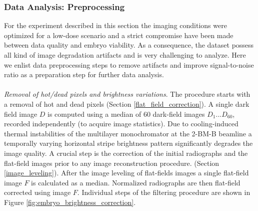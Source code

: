 \subsubsection{Data Analysis: Preprocessing}
For the experiment described in this section the imaging conditions were optimized for a low-dose scenario and a strict compromise have been made between data quality and embryo viability. As a consequence, the dataset possess all kind of image degradation artifacts and is very challenging to analyze. 
Here we enlist data preprocessing steps to remove artifacts and improve signal-to-noise ratio as a preparation step for further data analysis. 
\\
\\
\textit{Removal of hot/dead pixels and brightness variations}. The procedure starts with a removal of hot and dead pixels (Section \ref{flat_field_correction}). A single dark field image $D$ is computed using a median of 60 dark-field images $D_1 ... D_{60}$, recorded independently (to acquire image statistics). 
Due to cooling-induced thermal instabilities of the multilayer monochromator at the 2-BM-B beamline a temporally varying horizontal stripe brightness pattern significantly degrades the image quality. A crucial step is the correction of the initial radiographs and the flat-field images prior to any image reconstruction procedure.
 (Section \ref{image_leveling}). After the image leveling of flat-fields images a single flat-field image $F$ is calculated as a median. Normalized radiographs are then flat-field corrected using image $F$. Individual steps of the filtering procedure are shown in Figure \ref{fig:embryo_brightness_correction}.
